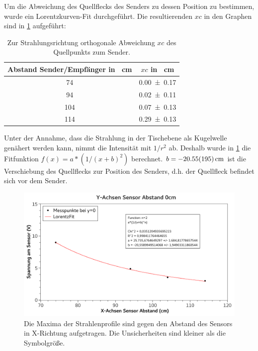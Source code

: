 \documentclass[
	a4paper,
	12pt,
	pagesize,
	ngerman
]{scrartcl}
\begin{document}
	Um die Abweichung des Quellflecks des Senders zu dessen Position zu bestimmen, wurde ein Lorentzkurven-Fit durchgeführt. Die resultierenden $xc$ in den Graphen sind in \cref{tab_xc} aufgeführt:
	\begin{table}[H]
		\centering
		\begin{tabular}{ c | c }
			Abstand Sender/Empfänger in \SI{}{cm} & $xc$ in \SI{}{cm}  \\ \hline
			\SI{74}{}&\SI{0,00+-0,17}{}\\
			\SI{94}{}&\SI{0,02+-0,11}{}\\
			\SI{104}{}&\SI{0,07+-0,13}{}\\
			\SI{114}{}&\SI{0,29+-0,13}{}\\
		\end{tabular}
		\caption{Zur Strahlungsrichtung orthogonale Abweichung $xc$ des Quellpunkts zum Sender.}
		\label{tab_xc} 
	\end{table}
	Unter der Annahme, dass die Strahlung in der Tischebene als Kugelwelle genähert werden kann, nimmt die Intensität mit $1/r^2$ ab. 
	Deshalb wurde in \cref{fig_y0cm} die Fitfunktion $f(x)=a*(1/(x+b)^2)$ berechnet. $b=\SI{-20,55+-1,95}{cm}$ ist die Verschiebung des Quellflecks zur Position des Senders, d.h. der Quellfleck befindet sich vor dem Sender. %
	\begin{figure}[H]
		\includegraphics[width=1\textwidth]{fig_y0cm}
		\centering
		\caption{Die Maxima der Strahlenprofile sind gegen den Abstand des Sensors in X-Richtung aufgetragen. Die Unsicherheiten sind kleiner als die Symbolgröße.}
		\label{fig_y0cm}
		\centering
	\end{figure}

	
\end{document}
